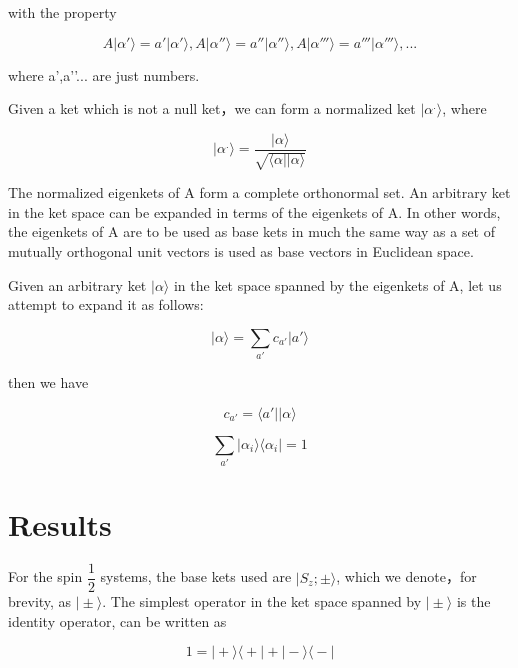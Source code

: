 \documentclass[a4paper]{article}
\newcommand{\ket}[1]{\big|  #1 \big \rangle }
\newcommand{\bra}[1]{ \big\langle #1 \big | }
\begin{document}
with the property

\begin{equation}
A \ket{\alpha'} = a' \ket{\alpha'}  , A \ket{\alpha''} = a'' \ket{\alpha''} , A \ket{\alpha'''} = a''' \ket{\alpha'''} , ...
\end{equation}

where a’,a’’... are just numbers.

Given a ket which is not a null ket，we can form a normalized ket $\ket{\alpha^{.}}$, where

\begin{equation}
\ket{\alpha^{.}} = \frac{\ket{\alpha}}{\sqrt{\bra{\alpha} \ket{\alpha}}}
\end{equation}

The normalized eigenkets of A form a complete orthonormal set. An arbitrary ket in the ket space can be expanded in terms of the eigenkets of A. In other words, the eigenkets of A are to be used as base kets in much the same way as a set of mutually orthogonal unit vectors is used as base vectors in Euclidean space.

Given an arbitrary ket $\ket{\alpha}$ in the ket space spanned by the eigenkets of A, let us attempt to expand it as follows:

\begin{equation}
\ket{\alpha} = \sum_{a'} c_{a'} \ket{a'}
\end{equation}

then we have

\begin{equation}
c_{a'} = \bra{a'} \ket{\alpha}
\end{equation}

\begin{equation}
\sum_{a'}\ket{\alpha_i}\bra{\alpha_i} = 1
\end{equation}

\section{Results}

For the spin $ \dfrac{1}{2} $ systems, the base kets used are $ \ket{S_z;\pm} $, which we denote，for brevity, as $ \ket{\pm} $. The simplest operator in the ket space spanned by $ \ket{\pm} $ is the identity operator, can be written as

\begin{equation}
1 = \ket{+} \bra{+} + \ket{-} \bra{-}
\end{equation}
\end{document}

